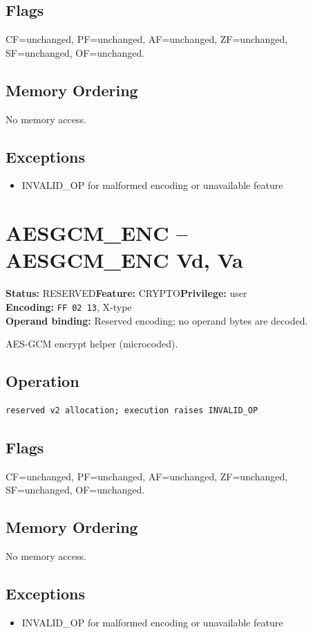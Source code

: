 \documentclass[10pt]{article}
\begin{document}
\subsection*{Flags}
CF=unchanged, PF=unchanged, AF=unchanged, ZF=unchanged, SF=unchanged, OF=unchanged.
\subsection*{Memory Ordering}
No memory access.
\subsection*{Exceptions}
\begin{itemize}
\item INVALID\_OP for malformed encoding or unavailable feature
\end{itemize}
\clearpage

\section{AESGCM\_ENC -- AESGCM\_ENC Vd, Va}
\textbf{Status:} RESERVED\quad \textbf{Feature:} CRYPTO\quad \textbf{Privilege:} user\\
\textbf{Encoding:} \texttt{FF 02 13}, X-type\\
\textbf{Operand binding:} Reserved encoding; no operand bytes are decoded.

AES-GCM encrypt helper (microcoded).

\subsection*{Operation}
\begin{lstlisting}
reserved v2 allocation; execution raises INVALID_OP
\end{lstlisting}
\subsection*{Flags}
CF=unchanged, PF=unchanged, AF=unchanged, ZF=unchanged, SF=unchanged, OF=unchanged.
\subsection*{Memory Ordering}
No memory access.
\subsection*{Exceptions}
\begin{itemize}
\item INVALID\_OP for malformed encoding or unavailable feature
\end{itemize}
\clearpage
\end{document}
